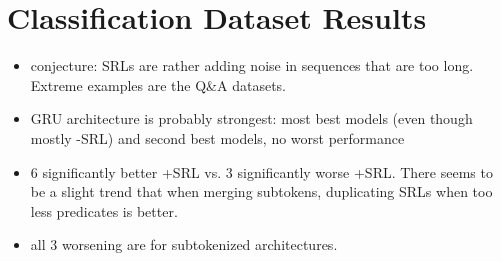 







\section{Classification Dataset Results}
\label{sec:classification-results}

{\color{red} \begin{itemize}
  \item conjecture: SRLs are rather adding noise in sequences that are too long. Extreme examples are the Q\&A datasets.
  \item GRU architecture is probably strongest: most best models (even though mostly -SRL) and second best models, no worst performance
  \item 6 significantly better +SRL vs. 3 significantly worse +SRL. There seems to be a slight trend that when merging subtokens, duplicating SRLs when too less predicates is better.
  \item all 3 worsening are for subtokenized architectures.
\end{itemize}}


